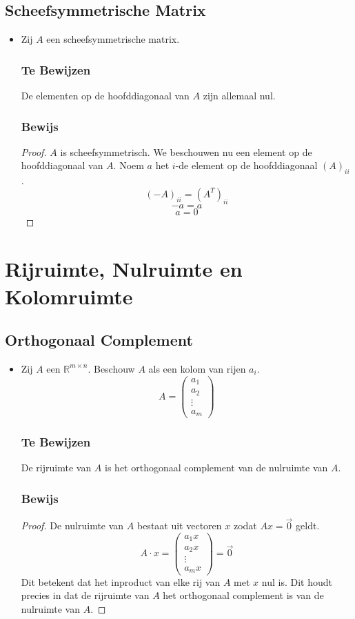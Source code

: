 \documentclass[lineaire_algebra_oplossingen.tex]{subfiles}
\begin{document}
\subsection{Scheefsymmetrische Matrix}
\begin{itemize}
\item
Zij $A$ een scheefsymmetrische matrix.
\subsubsection*{Te Bewijzen}
De elementen op de hoofddiagonaal van $A$ zijn allemaal nul.

\subsubsection*{Bewijs}
\begin{proof}
$A$ is scheefsymmetrisch. We beschouwen nu een element op de hoofddiagonaal van $A$. Noem $a$ het $i$-de element op de hoofddiagonaal $(A)_{ii}$.
\[
(-A)_{ii} = (A^T)_{ii}
\]
\[
-a = a
\]
\[
a = 0
\]
\end{proof}
\end{itemize}

\section{Rijruimte, Nulruimte en Kolomruimte}
\subsection*{Orthogonaal Complement}
\begin{itemize}
\item Zij $A$ een $\mathbb{R}^{m \times n}$. Beschouw $A$ als een kolom van rijen $a_i$.
\[
A = 
\begin{pmatrix}
a_1\\a_2\\\vdots\\a_m
\end{pmatrix}
\] 

\subsubsection*{Te Bewijzen}
De rijruimte van $A$ is het orthogonaal complement van de nulruimte van $A$.

\subsubsection*{Bewijs}
\begin{proof}
De nulruimte van $A$ bestaat uit vectoren $x$ zodat $Ax = \vec{0}$ geldt.
\[
A \cdot x = 
\begin{pmatrix}
a_1 x\\a_2 x\\\vdots\\a_m x  
\end{pmatrix}
=
\vec{0}
\]
Dit betekent dat het inproduct van elke rij van $A$ met $x$ nul is. Dit houdt precies in dat de rijruimte van $A$ het orthogonaal complement is van de nulruimte van $A$.
\end{proof}



\end{itemize}
\end{document}
